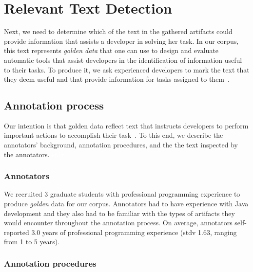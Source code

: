 


\section{Relevant Text Detection}
\label{cp4:corpus-relevant-text}






Next, we need to determine which 
of the text in the gathered artifacts could provide information that assists a developer in solving her task.
In our corpus, this text represents \textit{golden data} that one can use to design and evaluate automatic tools that assist developers in the identification of information useful to their tasks. 
To produce it, we 
ask experienced developers to
mark the text that they deem useful and that provide information for tasks assigned to them~\cite{nadi2020, Robillard2015, marques2020}.



\subsection{Annotation process}


Our intention is that golden data reflect text that instructs developers to perform important actions to accomplish their task~\cite{Robillard2015, Lotufo2012}.
To this end, we describe the annotators' background, annotation procedures, and the 
the text inspected by the annotators.
\textcolor{white}{\acs{stdv}} %





\subsubsection{Annotators}


We recruited 3 graduate students with professional programming experience to produce \textit{golden} data for our corpus. Annotators had to have experience with Java development and they also had to be familiar with the types of artifacts they would encounter throughout the annotation process. 
On average, annotators self-reported 3.0 years of professional
programming experience (stdv 1.63, ranging from 1 to 5 years).



\subsubsection{Annotation procedures}



